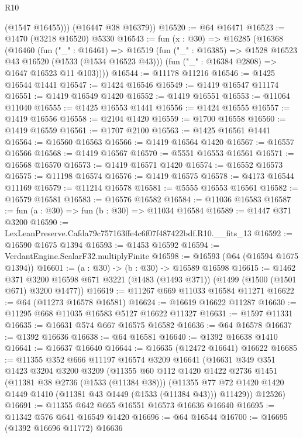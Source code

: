 \begin{lexlean}{R10}
\begin{coremodule}
          (@1547 @16455)))
      (@16447 @38 @16379))
@16520 := @64 @16471
@16523 := @1470 (@3218 @16520) @5330
@16543 := fun (x : @30) =>
  @16285
    (@16368
      (@16460
        (fun ("_" : @16461) =>
        @16519
          (fun ("_" : @16385) => @1528 @16523 @43 @16520 (@1533 (@1534 @16523 @43)))
          (fun ("_" : @16384 @2808) => @1647 @16523 @11 @103))))
@16544 := @11178 @11216
@16546 := @1425 @16544 @1441
@16547 := @1424 @16546
@16549 := @1419 @16547 @11174
@16551 := @1419 @16549 @1420
@16552 := @1419 @16551
@16553 := @11064 @11040
@16555 := @1425 @16553 @1441
@16556 := @1424 @16555
@16557 := @1419 @16556
@16558 := @2104 @1420
@16559 := @1700 @16558
@16560 := @1419 @16559
@16561 := @1707 @2100
@16563 := @1425 @16561 @1441
@16564 := @16560 @16563
@16566 := @1419 @16564 @1420
@16567 := @16557 @16566
@16568 := @1419 @16567
@16570 := @5551 @16553 @16561
@16571 := @16568 @16570
@16573 := @1419 @16571 @1420
@16574 := @16552 @16573
@16575 := @11198 @16574
@16576 := @1419 @16575
@16578 := @4173 @16544 @11169
@16579 := @11214 @16578
@16581 := @5555 @16553 @16561
@16582 := @16579 @16581
@16583 := @16576 @16582
@16584 := @11036 @16583
@16587 := fun (a : @30) => fun (b : @30) => @11034 @16584
@16589 := @1447 @371 @3200
@16590 := LexLeanPreserve.Cafda79c757163ffe4c6f07f487422bdf.R10.__fits_13
@16592 := @16590 @1675 @1394
@16593 := @1453 @16592
@16594 := VerdantEngine.ScalarF32.multiplyFinite
@16598 := @16593 (@64 (@16594 @1675 @1394))
@16601 := (a : @30) -> (b : @30) -> @16589 @16598
@16615 := @1462
    @371
    @3200
    @16598
    @671
    @3221
    (@1483 (@1493 @371))
    (@1499 (@1500 (@1501 @671) @3200 @1477))
@16619 := @11267 @669 @11033 @16584 @11271
@16622 := @64 (@11273 @16578 @16581)
@16624 := @16619 @16622 @11287
@16630 := @11295 @668 @11035 @16583 @5127 @16622 @11327
@16631 := @1597 @11331
@16635 := @16631 @574 @667 @16575 @16582
@16636 := @64 @16578
@16637 := @1392 @16636
@16638 := @64 @16581
@16640 := @1392 @16638 @1410
@16641 := @16637 @16640
@16644 := @16635 (@12472 @16641) @16622
@16685 := @11355
    @352
    @666
    @11197
    @16574
    @3209
    @16641
    (@16631
      @349
      @351
      @1423
      @3204
      @3200
      @3209
      (@11355
        @60
        @112
        @1420
        @1422
        @2736
        @1451
        (@11381 @38 @2736 (@1533 (@11384 @38)))
        (@11355 @77 @72 @1420 @1420 @1449 @1410 (@11381 @43 @1449 (@1533 (@11384 @43))) @11429))
      @12526)
@16691 := @11355 @642 @665 @16551 @16573 @16636 @16640
@16695 := @11342 @576 @641 @16549 @1420
@16696 := @64 @16544
@16700 := @16695 (@1392 @16696 @11772) @16636

\end{coremodule}
\end{lexlean}
